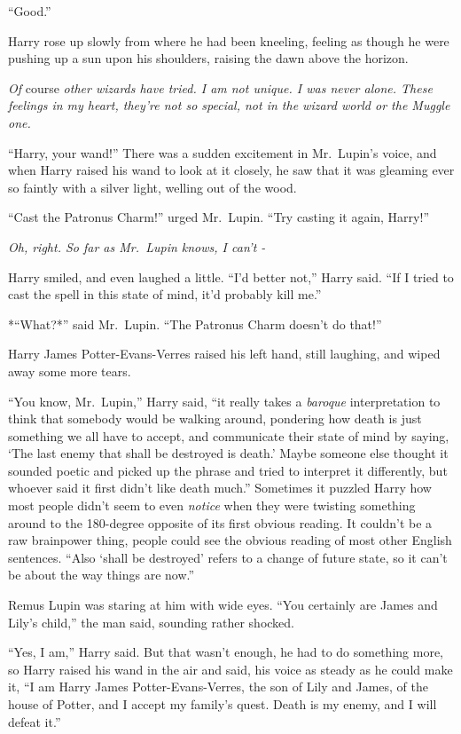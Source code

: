 ``Good.''

Harry rose up slowly from where he had been kneeling, feeling as though
he were pushing up a sun upon his shoulders, raising the dawn above the
horizon. \emph{\\}

\emph{Of} course \emph{other wizards have tried. I am not unique. I was
never alone. These feelings in my heart, they're not so special, not in
the wizard world or the Muggle one.}

``Harry, your wand!'' There was a sudden excitement in Mr.~Lupin's
voice, and when Harry raised his wand to look at it closely, he saw that
it was gleaming ever so faintly with a silver light, welling out of the
wood.

``Cast the Patronus Charm!'' urged Mr.~Lupin. ``Try casting it again,
Harry!''

\emph{Oh, right. So far as Mr.~Lupin knows, I can't -}

Harry smiled, and even laughed a little. ``I'd better not,'' Harry said.
``If I tried to cast the spell in this state of mind, it'd probably kill
me.''

*``What?*'' said Mr.~Lupin. ``The Patronus Charm doesn't do that!''

Harry James Potter-Evans-Verres raised his left hand, still laughing,
and wiped away some more tears.

``You know, Mr.~Lupin,'' Harry said, ``it really takes a \emph{baroque}
interpretation to think that somebody would be walking around, pondering
how death is just something we all have to accept, and communicate their
state of mind by saying, `The last enemy that shall be destroyed is
death.' Maybe someone else thought it sounded poetic and picked up the
phrase and tried to interpret it differently, but whoever said it first
didn't like death much.'' Sometimes it puzzled Harry how most people
didn't seem to even \emph{notice} when they were twisting something
around to the 180-degree opposite of its first obvious reading. It
couldn't be a raw brainpower thing, people could see the obvious reading
of most other English sentences. ``Also `shall be destroyed' refers to a
change of future state, so it can't be about the way things are now.''

Remus Lupin was staring at him with wide eyes. ``You certainly are James
and Lily's child,'' the man said, sounding rather shocked.

``Yes, I am,'' Harry said. But that wasn't enough, he had to do
something more, so Harry raised his wand in the air and said, his voice
as steady as he could make it, ``I am Harry James Potter-Evans-Verres,
the son of Lily and James, of the house of Potter, and I accept my
family's quest. Death is my enemy, and I will defeat it.''

